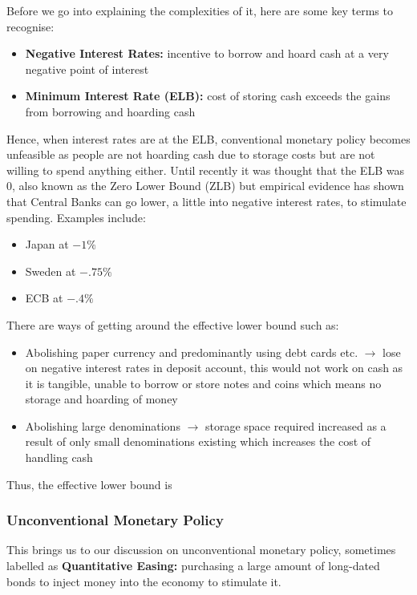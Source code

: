 \documentclass[12pt, letterpaper]{article}
\begin{document}
Before we go into explaining the complexities of it, here are some key terms to recognise:
\begin{itemize}
	\item \textbf{Negative Interest Rates:} incentive to borrow and hoard cash at a very negative point of interest
	\item \textbf{Minimum Interest Rate (ELB):} cost of storing cash exceeds the gains from borrowing and hoarding cash
\end{itemize}
Hence, when interest rates are at the ELB, conventional monetary policy becomes unfeasible as people are not hoarding cash due to storage costs but are not willing to spend anything either. Until recently it was thought that the ELB was 0, also known as the Zero Lower Bound (ZLB) but empirical evidence has shown that Central Banks can go lower, a little into negative interest rates, to stimulate spending. Examples include:
\begin{itemize}
	\item Japan at $-1\%$
	\item Sweden at $-.75\%$
	\item ECB at $-.4\%$
\end{itemize}
There are ways of getting around the effective lower bound such as:
\begin{itemize}
	\item Abolishing paper currency and predominantly using debt cards etc. $\rightarrow$ lose on negative interest rates in deposit account, this would not work on cash as it is tangible, unable to borrow or store notes and coins which means no storage and hoarding of money
	\item Abolishing large denominations $\rightarrow$ storage space required increased as a result of only small denominations existing which increases the cost of handling cash
\end{itemize}
Thus, the effective lower bound is %

\subsubsection{Unconventional Monetary Policy}
This brings us to our discussion on unconventional monetary policy, sometimes labelled as \textbf{Quantitative Easing:} purchasing a large amount of long-dated bonds to inject money into the economy to stimulate it.
\end{document}
